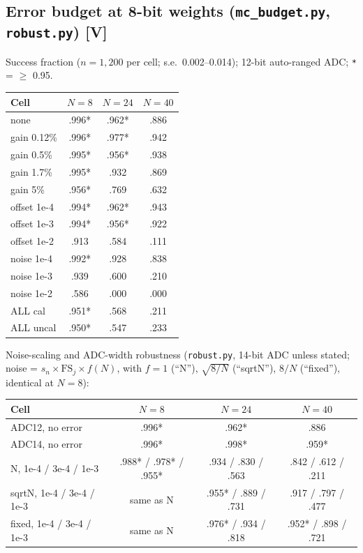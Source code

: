 \documentclass[11pt]{article}
\newcommand{\scr}[1]{\texttt{#1}}
\begin{document}
\subsection{Error budget at 8-bit weights (\scr{mc\_budget.py}, \scr{robust.py}) [V]}\label{sec:budget}

Success fraction ($n = 1{,}200$ per cell; s.e.\ 0.002--0.014); 12-bit auto-ranged ADC; \texttt{*} = $\geq$ 0.95.

\begin{center}
\begin{tabular}{lccc}
\toprule
Cell & $N = 8$ & $N = 24$ & $N = 40$ \\
\midrule
none & .996* & .962* & .886 \\
gain 0.12\% & .996* & .977* & .942 \\
gain 0.5\% & .995* & .956* & .938 \\
gain 1.7\% & .995* & .932 & .869 \\
gain 5\% & .956* & .769 & .632 \\
offset 1e-4 & .994* & .962* & .943 \\
offset 1e-3 & .994* & .956* & .922 \\
offset 1e-2 & .913 & .584 & .111 \\
noise 1e-4 & .992* & .928 & .838 \\
noise 1e-3 & .939 & .600 & .210 \\
noise 1e-2 & .586 & .000 & .000 \\
ALL cal & .951* & .568 & .211 \\
ALL uncal & .950* & .547 & .233 \\
\bottomrule
\end{tabular}
\end{center}

Noise-scaling and ADC-width robustness (\scr{robust.py}, 14-bit ADC unless stated; noise = $s_n \times \mathrm{FS}_j \times f(N)$, with $f = 1$ (``N''), $\sqrt{8/N}$ (``sqrtN''), $8/N$ (``fixed''), identical at $N = 8$):

\begin{center}
\small
\begin{tabular}{lccc}
\toprule
Cell & $N = 8$ & $N = 24$ & $N = 40$ \\
\midrule
ADC12, no error & .996* & .962* & .886 \\
ADC14, no error & .996* & .998* & .959* \\
N, 1e-4 / 3e-4 / 1e-3 & .988* / .978* / .955* & .934 / .830 / .563 & .842 / .612 / .211 \\
sqrtN, 1e-4 / 3e-4 / 1e-3 & same as N & .955* / .889 / .731 & .917 / .797 / .477 \\
fixed, 1e-4 / 3e-4 / 1e-3 & same as N & .976* / .934 / .818 & .952* / .898 / .721 \\
\bottomrule
\end{tabular}
\end{center}
\end{document}
